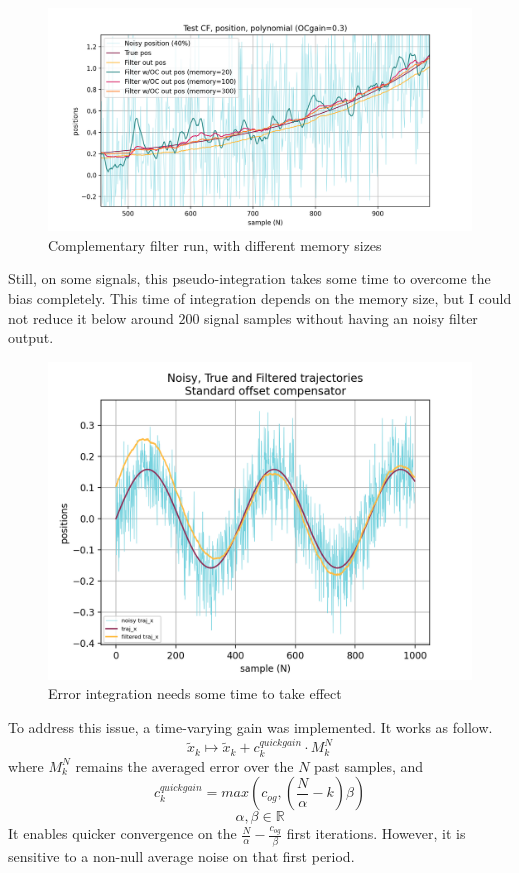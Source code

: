 \documentclass[a4paper,10pt]{article}
\begin{document}
\begin{figure}[H]
\centering
  \includegraphics[width=\linewidth, angle=0, scale=1.1]{./images/TestCF_run14_polynomial.png}
  \caption{Complementary filter run, with different memory sizes}
\end{figure}

Still, on some signals, this pseudo-integration takes some time to overcome the bias completely. This time of integration depends on the memory size, but I could not reduce it below around $200$ signal samples without having an noisy filter output. 

\begin{figure}[H]
\centering
  \includegraphics[width=\linewidth, angle=0, scale=0.8]{./images/CF_test_sinus_1_Standard.png}
  \caption{Error integration needs some time to take effect}
\end{figure}


To address this issue, a time-varying gain was implemented. It works as follow.
$$\widetilde{x}_k \mapsto \widetilde{x}_k + c_k^{quickgain} \cdot M_k^N$$
where $M_k^N$ remains the averaged error over the $N$ past samples, and
$$c_k^{quickgain} = max( c_{og} , (\frac{N}{\alpha} - k)\beta) $$
$$\alpha, \beta \in\mathbb{R}$$
It enables quicker convergence on the $\frac{N}{\alpha} - \frac{c_{og}}{\beta}$ first iterations. However, it is sensitive to a non-null average noise on that first period.
\end{document}
